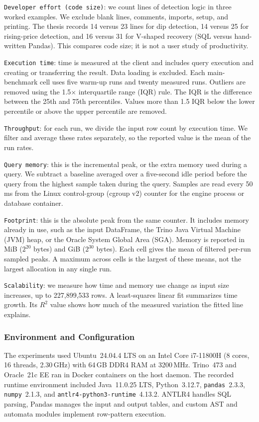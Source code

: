 \documentclass[preprint,12pt,times,a4paper]{elsarticle}
\begin{document}
\texttt{Developer effort (code size)}: we count lines of detection logic in
three worked examples. We exclude blank lines, comments, imports, setup, and
printing. The thesis records 14 versus 23 lines for dip detection, 14 versus
25 for rising-price detection, and 16 versus 31 for V-shaped recovery (SQL
versus hand-written Pandas). This compares code size; it is not a user study
of productivity.

\texttt{Execution time}: time is measured at the client and includes query
execution and creating or transferring the result. Data loading is excluded.
Each main-benchmark cell uses five warm-up runs and twenty measured runs.
Outliers are removed using the 1.5$\times$ interquartile range (IQR) rule.
The IQR is the difference between the 25th and 75th percentiles. Values more
than 1.5 IQR below the lower percentile or above the upper percentile are
removed.

\texttt{Throughput}: for each run, we divide the input row count by execution
time. We filter and average these rates separately, so the reported value is
the mean of the run rates.

\texttt{Query memory}: this is the incremental peak, or the extra memory
used during a query. We subtract a baseline averaged over a five-second idle
period before the query from the highest sample taken during the query.
Samples are read every 50\,ms from the Linux control-group (cgroup v2)
counter for the engine process or database container.

\texttt{Footprint}: this is the absolute peak from the same counter. It
includes memory already in use, such as the input DataFrame, the Trino Java
Virtual Machine (JVM) heap, or the Oracle System Global Area (SGA). Memory is
reported in MiB ($2^{20}$ bytes) and GiB ($2^{30}$ bytes). Each cell gives the
mean of filtered per-run sampled peaks. A maximum across cells is the largest
of these means, not the largest allocation in any single run.

\texttt{Scalability}: we measure how time and memory use change as input size
increases, up to 227,899,533 rows. A least-squares linear fit summarizes time
growth. Its $R^2$ value shows how much of the measured variation the fitted
line explains.

\subsubsection{Environment and Configuration}

The experiments used Ubuntu~24.04.4 LTS on an Intel Core i7-11800H
(8 cores, 16 threads, 2.30\,GHz) with 64\,GB DDR4 RAM at 3200\,MHz.
Trino~473 and Oracle~21c EE ran in Docker containers on the host daemon.
The recorded runtime environment included Java~11.0.25 LTS,
Python~3.12.7, \texttt{pandas}~2.3.3, \texttt{numpy}~2.1.3, and
\texttt{antlr4-python3-runtime}~4.13.2. ANTLR4 handles SQL parsing,
Pandas manages the input and output tables, and custom AST and automata
modules implement row-pattern execution.
\end{document}
